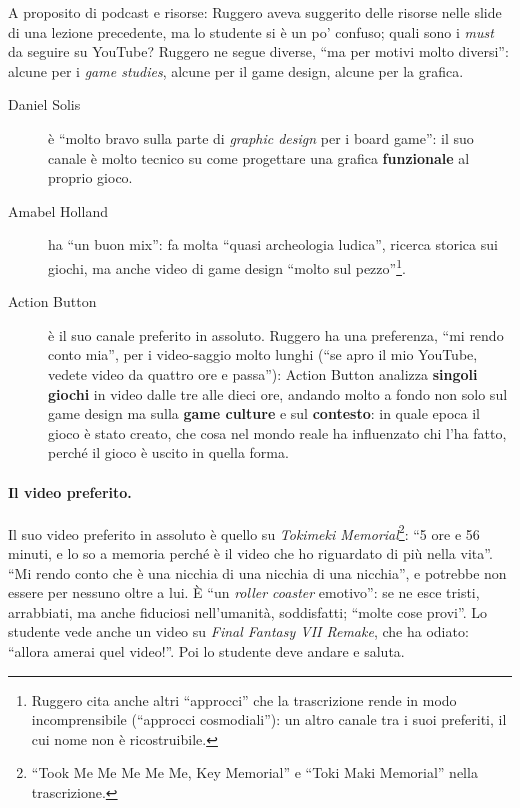 A proposito di podcast e risorse: Ruggero aveva suggerito delle risorse nelle slide di
una lezione precedente, ma lo studente si è un po' confuso; quali sono i
\emph{must} da seguire su YouTube? Ruggero ne segue diverse, ``ma per motivi molto
diversi'': alcune per i \emph{game studies}, alcune per il game design, alcune per la
grafica.
\begin{description}
  \item[Daniel Solis] è ``molto bravo sulla parte di \emph{graphic design} per i
        board game'': il suo canale è molto tecnico su come progettare una grafica
        \textbf{funzionale} al proprio gioco.
  \item[Amabel Holland] ha ``un buon mix'': fa molta ``quasi archeologia ludica'',
        ricerca storica sui giochi, ma anche video di game design ``molto sul
        pezzo''\footnote{Ruggero cita anche altri ``approcci'' che la trascrizione
        rende in modo incomprensibile (``approcci cosmodiali''): un altro canale tra i
        suoi preferiti, il cui nome non è ricostruibile.}.
  \item[Action Button] è il suo canale preferito in assoluto. Ruggero ha una
        preferenza, ``mi rendo conto mia'', per i video-saggio molto lunghi (``se apro il
        mio YouTube, vedete video da quattro ore e passa''): Action Button analizza
        \textbf{singoli giochi} in video dalle tre alle dieci ore, andando molto a
        fondo non solo sul game design ma sulla \textbf{game culture} e sul
        \textbf{contesto}: in quale epoca il gioco è stato creato, che cosa nel mondo
        reale ha influenzato chi l'ha fatto, perché il gioco è uscito in quella forma.
\end{description}

\paragraph{Il video preferito.} Il suo video preferito in assoluto è quello su
\emph{Tokimeki Memorial}\footnote{``Took Me Me Me Me Me, Key Memorial'' e ``Toki Maki
Memorial'' nella trascrizione.}: ``5 ore e 56 minuti, e lo so a memoria perché è il
video che ho riguardato di più nella vita''. ``Mi rendo conto che è una nicchia di una
nicchia di una nicchia'', e potrebbe non essere per nessuno oltre a lui. È ``un
\emph{roller coaster} emotivo'': se ne esce tristi, arrabbiati, ma anche fiduciosi
nell'umanità, soddisfatti; ``molte cose provi''. Lo studente vede anche un video su
\emph{Final Fantasy VII Remake}, che ha odiato: ``allora amerai quel video!''. Poi lo
studente deve andare e saluta.

